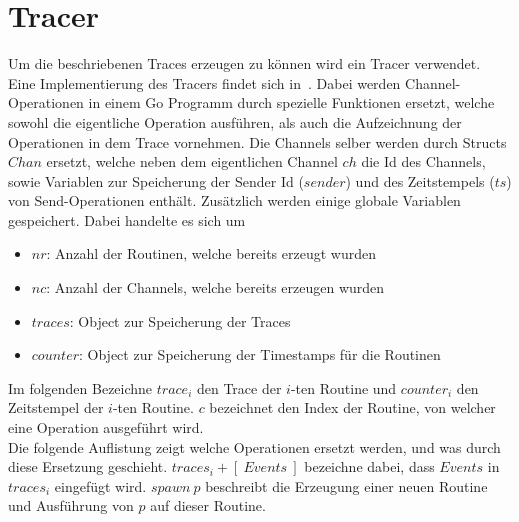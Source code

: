 \section{Tracer}
Um die beschriebenen Traces erzeugen zu können wird ein Tracer verwendet. 
Eine Implementierung des Tracers findet sich in~\cite{GoChan}. Dabei werden 
Channel-Operationen in einem Go Programm durch spezielle Funktionen ersetzt, 
welche sowohl die eigentliche Operation ausführen, als auch die Aufzeichnung 
der Operationen in dem Trace vornehmen. Die Channels selber werden durch 
Structs $Chan$ ersetzt, welche neben dem eigentlichen Channel $ch$ die Id des Channels, 
sowie Variablen zur Speicherung der Sender Id ($sender$) und des Zeitstempels 
($ts$) von 
Send-Operationen enthält. Zusätzlich werden einige globale Variablen gespeichert.
Dabei handelte es sich um 
\begin{itemize}
  \item $nr$: Anzahl der Routinen, welche bereits erzeugt wurden
  \item $nc$: Anzahl der Channels, welche bereits erzeugen wurden
  \item $traces$: Object zur Speicherung der Traces
  \item $counter$: Object zur Speicherung der Timestamps für die Routinen
\end{itemize}
Im folgenden Bezeichne $trace_i$ den Trace der $i$-ten Routine und $counter_i$ 
den Zeitstempel der $i$-ten Routine. $c$ bezeichnet den 
Index der Routine, 
von welcher eine Operation ausgeführt wird.\\
Die folgende Auflistung zeigt welche Operationen ersetzt werden, und was
durch diese Ersetzung geschieht. $traces_i + [\ Events\ ]$ bezeichne dabei, 
dass $Events$ in $traces_i$ eingefügt wird. $spawn\ p$ beschreibt die Erzeugung 
einer neuen Routine und Ausführung von $p$ auf dieser Routine.\\
